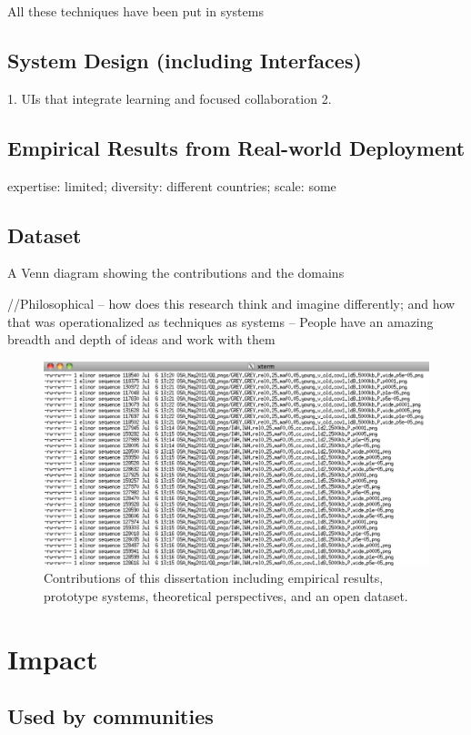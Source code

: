 All these techniques have been put in systems

\subsection{System Design (including Interfaces)}
1. UIs that integrate learning and focused collaboration
2. 

\subsection{Empirical Results from Real-world Deployment}
expertise: limited; diversity: different countries; scale: some


\subsection{Dataset}

A Venn diagram showing the contributions and the domains

//Philosophical -- how does this research think and imagine differently; and how that was operationalized as techniques as systems
-- People have an amazing breadth and depth of ideas and work with them


\begin{figure}[t!] 
  \centering
    \includegraphics[width=1.0\textwidth]{img/files}
  \caption[Contributions of this dissertation]
{Contributions of this dissertation including empirical results, prototype systems, theoretical perspectives, and an open dataset.}
  \label{fig:contributions}
\end{figure}

\section{Impact}
 \subsection{Used by communities}
